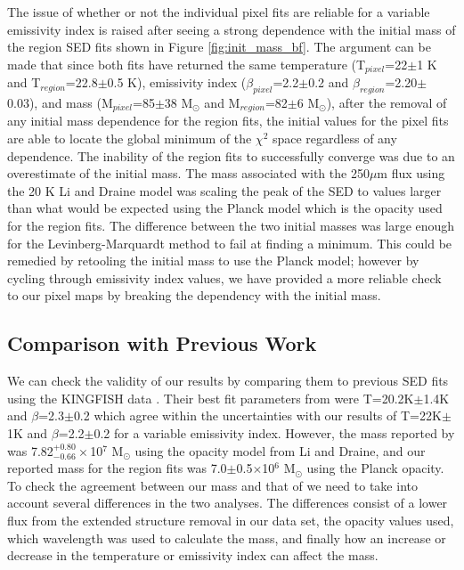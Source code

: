 The issue of whether or not the individual pixel fits are reliable for a variable emissivity index is raised after seeing a strong dependence with the initial mass of the region SED fits shown in Figure \ref{fig:init_mass_bf}.  The argument can be made that since both fits have returned the same temperature (T$_{pixel}$=22$\pm$1 K and T$_{region}$=22.8$\pm$0.5 K), emissivity index ($\beta_{pixel}$=2.2$\pm$0.2 and $\beta_{region}$=2.20$\pm$0.03), and mass (M$_{pixel}$=85$\pm$38 M$_\odot$ and M$_{region}$=82$\pm$6 M$_\odot$), after the removal of any initial mass dependence for the region fits, the initial values for the pixel fits are able to locate the global minimum of the $\chi^2$ space regardless of any dependence.  The inability of the region fits to successfully converge was due to an overestimate of the initial mass.  The mass associated with the 250$\mu$m flux using the 20 K Li and Draine model was scaling the peak of the SED to values larger than what would be expected using the Planck model which is the opacity used for the region fits.  The difference between the two initial masses was large enough for the Levinberg-Marquardt method to fail at finding a minimum.  This could be remedied by retooling the initial mass to use the Planck model; however by cycling through emissivity index values, we have provided a more reliable check to our pixel maps by breaking the dependency with the initial mass.

\subsection{Comparison with Previous Work}

We can check the validity of our results by comparing them to previous SED fits using the KINGFISH data \citep{galametz2012}.  Their best fit parameters from were T=20.2K$\pm$1.4K and $\beta$=2.3$\pm$0.2 which agree within the uncertainties with our results of T=22K$\pm$1K and $\beta$=2.2$\pm$0.2 for a variable emissivity index.  However, the mass reported by \cite{galametz2012} was 7.82$^{+0.80}_{-0.66}\times$10$^7$ M$_\odot$ using the opacity model from Li and Draine, and our reported mass for the region fits was 7.0$\pm$0.5$\times$10$^6$ M$_\odot$ using the Planck opacity.  To check the agreement between our mass and that of \cite{galametz2012} we need to take into account several differences in the two analyses. The differences consist of a lower flux from the extended structure removal in our data set, the opacity values used, which wavelength was used to calculate the mass, and finally how an increase or decrease in the temperature or emissivity index can affect the mass.  

